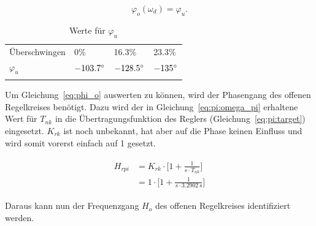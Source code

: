 
\begin{equation} \label{eq:phi_o}
    \varphi_o(\omega_d)=\varphi_u.
\end{equation}

\clearpage

\begin{longtable}{llll}
    \toprule
    \endhead
    \endfoot
    \endlastfoot


    \"Uberschwingen & 0\%              & 16.3\%           & 23.3\% \\
    $\varphi_u$        & $-103.7 \degree$ & $-128.5 \degree$ & $-135 \degree$ \\

    \bottomrule
    \caption{Werte f\"ur $\varphi_u$}
    \label{tab:phi_s}
\end{longtable}

Um    Gleichung~\ref{eq:phi_o}    auswerten     zu    k\"onnen,    wird    der
Phasengang   des   offenen   Regelkreises   ben\"otigt. Dazu   wird   der   in
Gleichung~\ref{eq:pi:omega_pi}    erhaltene    Wert    f\"ur    $T_{nk}$    in
die   \"Ubertragungsfunktion    des   Reglers   (Gleichung~\ref{eq:pi:target})
eingesetzt. $K_{rk}$  ist  noch  unbekannt,  hat aber  auf  die  Phase  keinen
Einfluss und wird somit vorerst einfach auf 1 gesetzt.

\begin{gather} \label{eq:pi:target:inserted}
    \begin{split}
        H_{rpi} & = K_{rk} \cdot \biggl[ 1 + \frac{1}{s \cdot T_{nk}} \biggr] \\
                & = 1      \cdot \biggl[ 1 + \frac{1}{s \cdot \SI{3.2902}{\second}} \biggr]
    \end{split}
\end{gather}

Daraus kann nun der Frequenzgang  $H_o$ des offenen Regelkreises identifiziert
werden.

